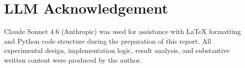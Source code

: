 \documentclass{article}
\begin{document}



\section*{LLM Acknowledgement}

Claude Sonnet 4.6 (Anthropic) was used for assistance with LaTeX formatting and
Python code structure during the preparation of this report.
All experimental design, implementation logic, result analysis, and substantive
written content were produced by the author.
\end{document}
